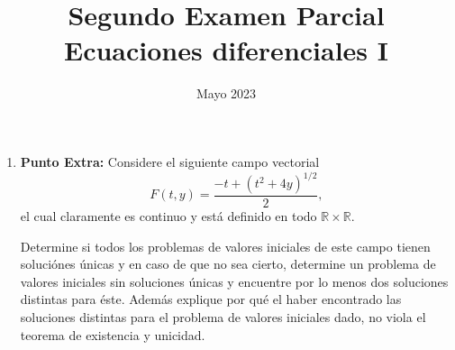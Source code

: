 \documentclass{article}
\title{Segundo Examen Parcial\\
Ecuaciones diferenciales I}
\date{Mayo 2023}
\begin{document}
\maketitle
\vspace{2cm}
\begin{enumerate}
\item \textbf{Punto Extra:} Considere el siguiente campo vectorial
        \[
            F(t,y)=\frac{-t+(t^{2}+4y)^{1/2}}{2},
        \]
        \noindent el cual claramente es continuo y está definido en todo $\mathbb{R}\times\mathbb{R}$.

Determine si todos los problemas de valores iniciales de este campo tienen soluciónes únicas y en caso de que no sea cierto, determine un problema de valores iniciales sin soluciones únicas y encuentre por lo menos dos soluciones distintas para éste. Además explique por qué el haber encontrado las soluciones distintas para el problema de valores iniciales dado, no viola el teorema de existencia y unicidad.
\end{enumerate}
\end{document}
